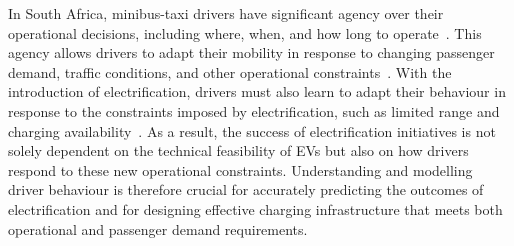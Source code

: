 \documentclass{elsarticle}
\begin{document}
In South Africa, minibus-taxi drivers have significant agency over their operational decisions, including where, when, and how long to operate~\cite{behrens2015_paratransit, ndibatya2020_kampalas_minibus_taxi_operations, vegter2020_sa_mbt_industry, schlueter2020_stochastic_mbt_behaviour_prediction}. This agency allows drivers to adapt their mobility in response to changing passenger demand, traffic conditions, and other operational constraints~\cite{schlueter2020_stochastic_mbt_behaviour_prediction, ndibatya2021_characterising_mbt_movement}. With the introduction of electrification, drivers must also learn to adapt their behaviour in response to the constraints imposed by electrification, such as limited range and charging availability~\cite{booysen2025_sys_of_sys_em_planning}. As a result, the success of electrification initiatives is not solely dependent on the technical feasibility of EVs but also on how drivers respond to these new operational constraints. Understanding and modelling driver behaviour is therefore crucial for accurately predicting the outcomes of electrification and for designing effective charging infrastructure that meets both operational and passenger demand requirements.

\end{document}
